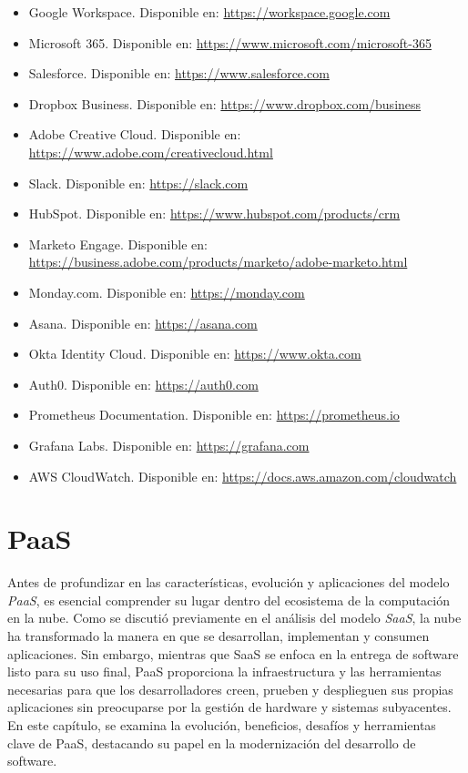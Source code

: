 {            \begin{itemize}
                \item Google Workspace. Disponible en: \url{https://workspace.google.com}
                \item Microsoft 365. Disponible en: \url{https://www.microsoft.com/microsoft-365}
                \item Salesforce. Disponible en: \url{https://www.salesforce.com}
                \item Dropbox Business. Disponible en: \url{https://www.dropbox.com/business}
                \item Adobe Creative Cloud. Disponible en: \url{https://www.adobe.com/creativecloud.html}
                \item Slack. Disponible en: \url{https://slack.com}
                \item HubSpot. Disponible en: \url{https://www.hubspot.com/products/crm}
                \item Marketo Engage. Disponible en: \url{https://business.adobe.com/products/marketo/adobe-marketo.html}
                \item Monday.com. Disponible en: \url{https://monday.com}
                \item Asana. Disponible en: \url{https://asana.com}
                \item Okta Identity Cloud. Disponible en: \url{https://www.okta.com}
                \item Auth0. Disponible en: \url{https://auth0.com}
                \item Prometheus Documentation. Disponible en: \url{https://prometheus.io}
                \item Grafana Labs. Disponible en: \url{https://grafana.com}
                \item AWS CloudWatch. Disponible en: \url{https://docs.aws.amazon.com/cloudwatch}
            \end{itemize}
            
    \section{PaaS}
        Antes de profundizar en las características, evolución y aplicaciones del modelo \textit{PaaS}, es esencial comprender su lugar dentro del ecosistema de la computación en la nube. Como se discutió previamente en el análisis del modelo \textit{SaaS}, la nube ha transformado la manera en que se desarrollan, implementan y consumen aplicaciones. Sin embargo, mientras que SaaS se enfoca en la entrega de software listo para su uso final, PaaS proporciona la infraestructura y las herramientas necesarias para que los desarrolladores creen, prueben y desplieguen sus propias aplicaciones sin preocuparse por la gestión de hardware y sistemas subyacentes. En este capítulo, se examina la evolución, beneficios, desafíos y herramientas clave de PaaS, destacando su papel en la modernización del desarrollo de software.
        
}
